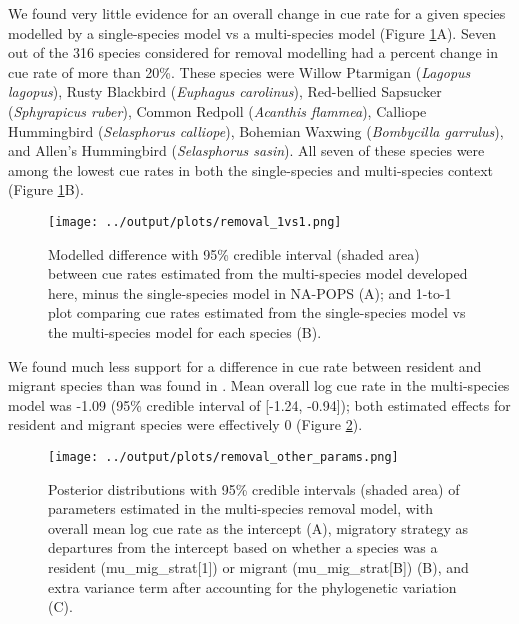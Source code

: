\documentclass[12pt]{article}
\begin{document}
\par We found very little evidence for an overall change in cue rate for a given species modelled by a single-species model vs a multi-species model (Figure \ref{fig:removal_1vs1}A).
Seven out of the 316 species considered for removal modelling had a percent change in cue rate of more than 20\%.
These species were Willow Ptarmigan (\textit{Lagopus lagopus}), Rusty Blackbird (\textit{Euphagus carolinus}), Red-bellied Sapsucker (\textit{Sphyrapicus ruber}), Common Redpoll (\textit{Acanthis flammea}), Calliope Hummingbird (\textit{Selasphorus calliope}), Bohemian Waxwing (\textit{Bombycilla garrulus}), and Allen's Hummingbird (\textit{Selasphorus sasin}).
All seven of these species were among the lowest cue rates in both the single-species and multi-species context (Figure \ref{fig:removal_1vs1}B).

\begin{figure}[h!]
	\texttt{[image: ../output/plots/removal\_1vs1.png]}
	\caption{Modelled difference with 95\% credible interval (shaded area) between cue rates estimated from the multi-species model developed here, minus the single-species model in NA-POPS \citep{edwards_point_2023} (A); and 1-to-1 plot comparing cue rates estimated from the single-species model vs the multi-species model for each species (B).}
	\label{fig:removal_1vs1}
\end{figure}


\par We found much less support for a difference in cue rate between resident and migrant species than was found in \citet{solymos_evaluating_2018}. 
Mean overall log cue rate in the multi-species model was -1.09 (95\% credible interval of [-1.24, -0.94]); both estimated effects for resident and migrant species were effectively 0 (Figure \ref{fig:removal_params}).

\begin{figure}[h!]
	\texttt{[image: ../output/plots/removal\_other\_params.png]}
	\caption{Posterior distributions with 95\% credible intervals (shaded area) of parameters estimated in the multi-species removal model, with overall mean log cue rate as the intercept (A), migratory strategy as departures from the intercept based on whether a species was a resident (mu\_mig\_strat[1]) or migrant (mu\_mig\_strat[B]) (B), and extra variance term after accounting for the phylogenetic variation (C).}
	\label{fig:removal_params}
\end{figure}
\end{document}
